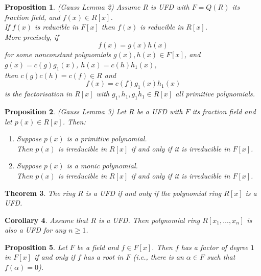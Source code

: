 \documentclass[a4paper,8pt]{article}
\newcommand{\hlt}[1]{\textit{{\color{blue}#1}}}
\theoremstyle{theorem}
\newtheorem{theorem}{Theorem}[subsection]
\newtheorem{corollary}[theorem]{Corollary}
\newtheorem{proposition}[theorem]{Proposition}
\begin{document}
\begin{proposition}
\hlt{(Gauss Lemma 2)} Assume $R$ is UFD with $F=Q(R)$ its fraction field, and $f(x) \in R[x]$.\\
If $f(x)$ is reducible in $F[x]$ then $f(x)$ is reducible in $R[x]$.\\
More precisely, if 
\begin{equation}
f(x)=g(x)h(x) \nonumber
\end{equation}
for some nonconstant polynomials $g(x), h(x) \in F[x]$, and $g(x)=c(g)g_1(x)$, $h(x)=c(h)h_1(x)$,\\
then $c(g)c(h)=c(f) \in R$ and 
\begin{equation}
f(x)=c(f)g_1(x)h_1(x) \nonumber
\end{equation}
is the factorisation in $R[x]$ with $g_1, h_1, g_1 h_1 \in R[x]$ all primitive polynomials.
\end{proposition}

\begin{proposition}
\hlt{(Gauss Lemma 3)} Let $R$ be a UFD with $F$ its fraction field and let $p(x) \in R[x]$. Then:
\begin{enumerate}[label=(\roman*)]
\item Suppose $p(x)$ is a primitive polynomial.\\
Then $p(x)$ is irreducible in $R[x]$ if and only if it is irreducible in $F[x]$.
\item Suppose $p(x)$ is a monic polynomial.\\
Then $p(x)$ is irreducible in $R[x]$ if and only if it is irreducible in $F[x]$.
\end{enumerate}
\end{proposition}

\begin{theorem}
The ring $R$ is a UFD if and only if the polynomial ring $R[x]$ is a UFD.
\end{theorem}

\begin{corollary}
Assume that $R$ is a UFD. Then polynomial ring $R[x_1, \ldots, x_n]$ is also a UFD for any $n \geq 1$.
\end{corollary}

\begin{proposition}
Let $F$ be a field and $f \in F[x]$. Then $f$ has a factor of degree $1$ in $F[x]$ if and only if $f$ has a root in $F$ (i.e., there is an $\alpha \in F$ such that $f(\alpha) = 0$).
\end{proposition}
\end{document}
